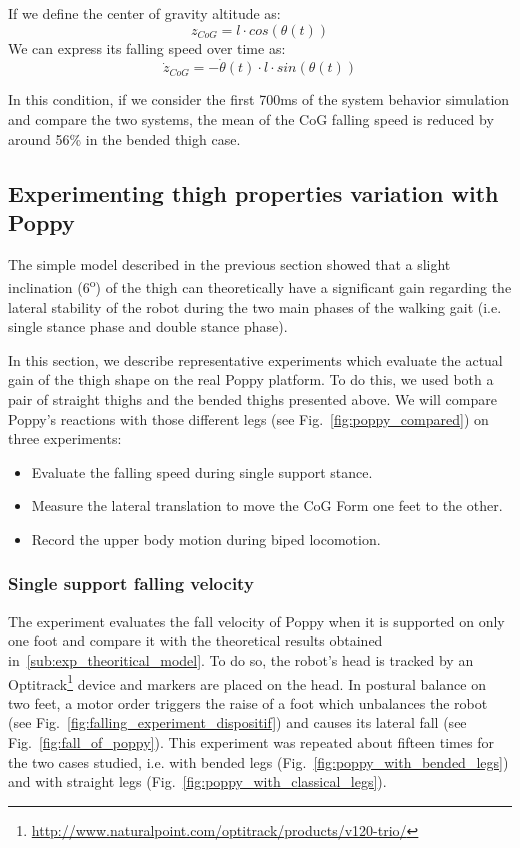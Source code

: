 If we define the center of gravity altitude as:
\begin{equation}
    z_{CoG} = l \cdot cos(\theta(t))
\end{equation}
We can express its falling speed over time as:
\begin{equation}
    \dot{z}_{CoG} = - \dot{\theta}(t) \cdot l \cdot sin(\theta(t))
\end{equation}

In this condition, if we consider the first 700ms of the system behavior simulation and compare the two systems, the mean of the CoG falling speed is reduced by around 56\% in the bended thigh case.


\subsection{Experimenting thigh properties variation with Poppy} %

The simple model described in the previous section showed that a slight inclination (6\textsuperscript{o}) of the thigh can theoretically have a significant gain regarding the lateral stability of the robot during the two main phases of the walking gait (i.e. single stance phase and double stance phase).

In this section, we describe representative experiments which evaluate the actual gain of the thigh shape on the real Poppy platform. To do this, we used both a pair of straight thighs and the bended thighs presented above. We will compare Poppy's reactions with those different legs (see Fig.~\ref{fig:poppy_compared}) on three experiments:
\begin{itemize}
    \item Evaluate the falling speed during single support stance.
    \item Measure the lateral translation to move the CoG Form one feet to the other.
    \item Record the upper body motion during biped locomotion.
\end{itemize}

\subsubsection{Single support falling velocity} %
\label{ssub:falling_velocity}
The experiment evaluates the fall velocity of Poppy when it is supported on only one foot and compare it with the theoretical results obtained in~\ref{sub:exp_theoritical_model}. To do so, the robot's head is tracked by an Optitrack\footnote{\url{http://www.naturalpoint.com/optitrack/products/v120-trio/}} device and markers are placed on the head. In postural balance on two feet, a motor order triggers the raise of a foot which unbalances the robot (see Fig.~\ref{fig:falling_experiment_dispositif}) and causes its lateral fall (see Fig.~\ref{fig:fall_of_poppy}). This experiment was repeated about fifteen times for the two cases studied, i.e. with bended legs (Fig.~\ref{fig:poppy_with_bended_legs}) and with straight legs (Fig.~\ref{fig:poppy_with_classical_legs}).

